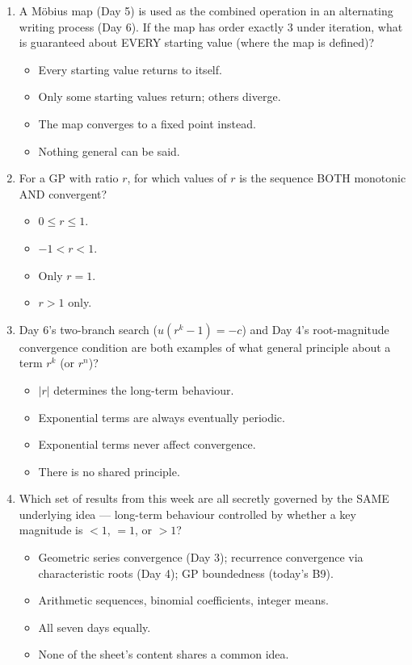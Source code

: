 \documentclass[11pt,a4paper]{article}
\begin{document}
\begin{enumerate}
\item A M\"obius map (Day 5) is used as the combined operation in an alternating writing process (Day 6). If the map has order exactly $3$ under iteration, what is guaranteed about EVERY starting value (where the map is defined)?
\begin{itemize}
\item[A)] Every starting value returns to itself.
\item[B)] Only some starting values return; others diverge.
\item[C)] The map converges to a fixed point instead.
\item[D)] Nothing general can be said.
\end{itemize}

\item For a GP with ratio $r$, for which values of $r$ is the sequence BOTH monotonic AND convergent?
\begin{itemize}
\item[A)] $0\leq r\leq1$.
\item[B)] $-1<r<1$.
\item[C)] Only $r=1$.
\item[D)] $r>1$ only.
\end{itemize}

\item Day 6's two-branch search ($u(r^k-1)=-c$) and Day 4's root-magnitude convergence condition are both examples of what general principle about a term $r^k$ (or $r^n$)?
\begin{itemize}
\item[A)] $|r|$ determines the long-term behaviour.
\item[B)] Exponential terms are always eventually periodic.
\item[C)] Exponential terms never affect convergence.
\item[D)] There is no shared principle.
\end{itemize}

\item Which set of results from this week are all secretly governed by the SAME underlying idea --- long-term behaviour controlled by whether a key magnitude is $<1$, $=1$, or $>1$?
\begin{itemize}
\item[A)] Geometric series convergence (Day 3); recurrence convergence via characteristic roots (Day 4); GP boundedness (today's B9).
\item[B)] Arithmetic sequences, binomial coefficients, integer means.
\item[C)] All seven days equally.
\item[D)] None of the sheet's content shares a common idea.
\end{itemize}

\end{enumerate}
\end{document}

